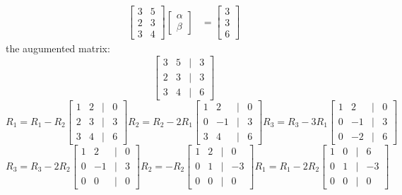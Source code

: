 \documentclass[11pt]{article}
\begin{document}
\begin{enumerate}
\begin{enumerate}
\[
\begin{aligned}
    \begin{bmatrix}
        3 & 5 \\
        2 & 3 \\
        3 & 4
    \end{bmatrix}
    \begin{bmatrix}
        \alpha \\
        \beta
    \end{bmatrix}
    &= \begin{bmatrix}
        3 \\
        3 \\
        6
    \end{bmatrix}
\end{aligned}
\]
the augumented matrix:
\[
\begin{bmatrix}
    3 & 5 &|& 3 \\
    2 & 3 &|& 3 \\
    3 & 4 &|& 6
\end{bmatrix}
\]
\[
R_1 = R_1 - R_2
\begin{bmatrix}
    1 & 2 &|& 0 \\
    2 & 3 &|& 3 \\
    3 & 4 &|& 6
\end{bmatrix}
R_2 = R_2 - 2R_1
\begin{bmatrix}
    1 & 2 &|& 0 \\
    0 & -1 &|& 3 \\
    3 & 4 &|& 6
\end{bmatrix}
R_3 = R_3 - 3R_1
\begin{bmatrix}
    1 & 2 &|& 0 \\
    0 & -1 &|& 3 \\
    0 & -2 &|& 6
\end{bmatrix}
\]
\[
R_3 = R_3 - 2R_2
\begin{bmatrix}
    1 & 2 &|& 0 \\
    0 & -1 &|& 3 \\
    0 & 0 &|& 0
\end{bmatrix}
R_2 = -R_2
\begin{bmatrix}
    1 & 2 &|& 0 \\
    0 & 1 &|& -3 \\
    0 & 0 &|& 0
\end{bmatrix}
R_1 = R_1 - 2R_2
\begin{bmatrix}
    1 & 0 &|& 6 \\
    0 & 1 &|& -3 \\
    0 & 0 &|& 0
\end{bmatrix}
\]
\end{enumerate}
\end{enumerate}
\end{document}
